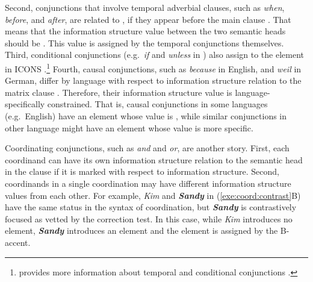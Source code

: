 \noindent Second, conjunctions that involve temporal adverbial
clauses, such as \textit{when}, \textit{before}, and \textit{after},
are related to , if they appear before the main clause
\citep{haiman:78}.  That means that the information structure value
between the two semantic heads should be . This value is
assigned by the temporal conjunctions themselves.  Third, conditional
conjunctions (e.g.\ \textit{if} and \textit{unless} in )
also assign  to the element in ICONS
\citep{ramsay:87}.\footnote{ provides more
  information about temporal and conditional
  conjunctions .}  Fourth, causal
conjunctions, such as \textit{because} in English, and \textit{weil}
in German, differ by language with respect to information structure
relation to the matrix clause \citep{heycock:07}. Therefore, their
information structure value is language-specifically
constrained. That is, causal conjunctions in
some languages (e.g.\ English) have an  element whose value
is , while similar conjunctions in other language might
have an  element whose value is more specific.










Coordinating conjunctions, such as \textit{and} and \textit{or}, are
another story. First, each coordinand can have its own information
structure relation to the semantic head in the clause if it is marked
with respect to information structure.  Second, coordinands in a
single coordination may have different information structure values
from each other. For example, \textit{Kim} and \textit{\textbf{Sandy}}
in (\ref{exe:coord:contrast}B) have the same status in the syntax of
coordination, but \textit{\textbf{Sandy}} is contrastively focused as
vetted by the correction test. In this case, while \textit{Kim}
introduces no  element, \textit{\textbf{Sandy}} introduces
an  element and the element is assigned
 by the B-accent.





